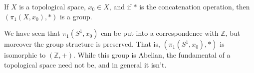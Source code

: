 \documentclass[crop=false,class=book,oneside]{standalone}
\begin{document}
        \begin{theorem}
            If $X$ is a topological space, $x_{0}\in{X}$, and if
            $*$ is the concatenation operation, then
            $(\pi_{1}(X,x_{0}),*)$ is a group.
        \end{theorem}
        \begin{lexample}
            We have seen that $\pi_{1}(S^{1},x_{0})$ can be put into
            a correspondence with $\mathbb{Z}$, but moreover the group
            structure is preserved. That is, $(\pi_{1}(S^{1},x_{0}),*)$ is
            isomorphic to $(\mathbb{Z},+)$. While this group is Abelian,
            the fundamental of a topological space need not be, and in
            general it isn't.
        \end{lexample}
\end{document}
